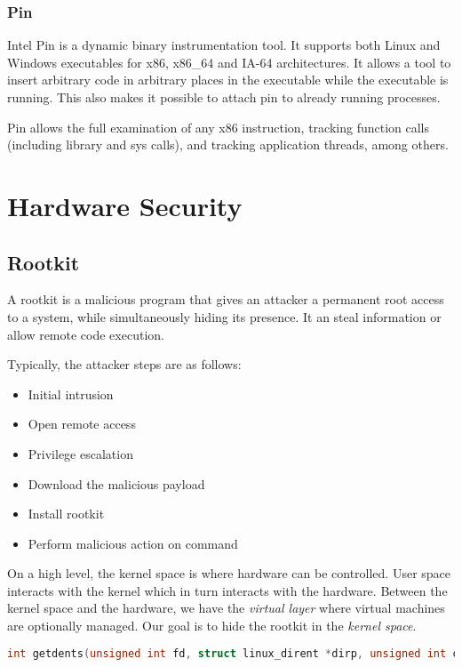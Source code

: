 \documentclass[11pt,a4paper,titlepage,dvipsnames,cmyk]{scrartcl}
\begin{document}
\subsubsection{Pin}
Intel Pin is a dynamic binary instrumentation tool. It supports both Linux and Windows executables for x86, x86\_64 and IA-64 architectures. It allows a tool to insert arbitrary code in arbitrary places in the executable while the executable is running. This also makes it possible to attach pin to already running processes.

Pin allows the full examination of any x86 instruction, tracking function calls (including library and sys calls), and tracking application threads, among others.


\section{Hardware Security}
\subsection{Rootkit}
A rootkit is a malicious program that gives an attacker a permanent root access to a system, while simultaneously hiding its presence. It an steal information or allow remote code execution.

Typically, the attacker steps are as follows:
\begin{itemize}
    \item Initial intrusion
    \item Open remote access
    \item Privilege escalation
    \item Download the malicious payload
    \item Install rootkit
    \item Perform malicious action on command
\end{itemize}

On a high level, the kernel space is where hardware can be controlled. User space interacts with the kernel which in turn interacts with the hardware. Between the kernel space and the hardware, we have the \textit{virtual layer} where virtual machines are optionally managed. Our goal is to hide the rootkit in the \textit{kernel space}.

\begin{lstlisting}[language=C]
int getdents(unsigned int fd, struct linux_dirent *dirp, unsigned int count);
\end{lstlisting}
\end{document}
